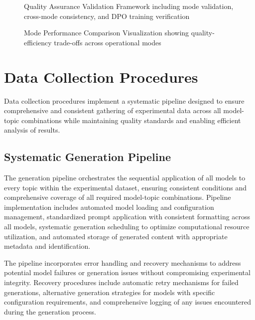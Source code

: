 \begin{figure}[htbp]
    \centering
    \caption{Quality Assurance Validation Framework including mode validation, cross-mode consistency, and DPO training verification}
    \label{fig:quality-assurance-framework}
\end{figure}

\begin{figure}[htbp]
    \centering
    \caption{Mode Performance Comparison Visualization showing quality-efficiency trade-offs across operational modes}
    \label{fig:mode-performance-comparison}
\end{figure}

\section{Data Collection Procedures}
\label{sec:data-collection}

Data collection procedures implement a systematic pipeline designed to ensure comprehensive and consistent gathering of experimental data across all model-topic combinations while maintaining quality standards and enabling efficient analysis of results.

\subsection{Systematic Generation Pipeline}

The generation pipeline orchestrates the sequential application of all models to every topic within the experimental dataset, ensuring consistent conditions and comprehensive coverage of all required model-topic combinations. Pipeline implementation includes automated model loading and configuration management, standardized prompt application with consistent formatting across all models, systematic generation scheduling to optimize computational resource utilization, and automated storage of generated content with appropriate metadata and identification.

The pipeline incorporates error handling and recovery mechanisms to address potential model failures or generation issues without compromising experimental integrity. Recovery procedures include automatic retry mechanisms for failed generations, alternative generation strategies for models with specific configuration requirements, and comprehensive logging of any issues encountered during the generation process.

